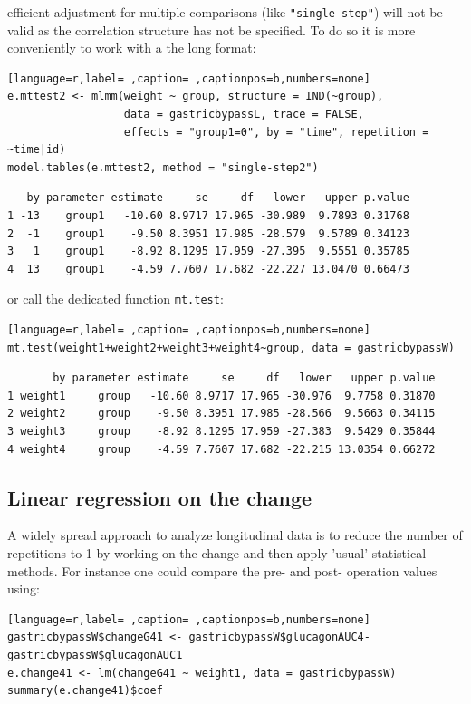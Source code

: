 \documentclass[12pt]{article}
\newcommand\Warning[1][3ex]{%
\renewcommand\stacktype{L}%
\scaleto{\stackon[1.3pt]{\color{red}$\triangle$}{\tiny\bfseries !}}{#1}%
\xspace
}
\begin{document}
\Warning efficient adjustment for multiple comparisons (like
\texttt{"single-step"}) will not be valid as the correlation structure has
not be specified. To do so it is more conveniently to work with a the
long format:
\begin{lstlisting}[language=r,label= ,caption= ,captionpos=b,numbers=none]
e.mttest2 <- mlmm(weight ~ group, structure = IND(~group),
                  data = gastricbypassL, trace = FALSE,
                  effects = "group1=0", by = "time", repetition = ~time|id)
model.tables(e.mttest2, method = "single-step2")
\end{lstlisting}

\begin{verbatim}
   by parameter estimate     se     df   lower   upper p.value
1 -13    group1   -10.60 8.9717 17.965 -30.989  9.7893 0.31768
2  -1    group1    -9.50 8.3951 17.985 -28.579  9.5789 0.34123
3   1    group1    -8.92 8.1295 17.959 -27.395  9.5551 0.35785
4  13    group1    -4.59 7.7607 17.682 -22.227 13.0470 0.66473
\end{verbatim}


or call the dedicated function \texttt{mt.test}:
\begin{lstlisting}[language=r,label= ,caption= ,captionpos=b,numbers=none]
mt.test(weight1+weight2+weight3+weight4~group, data = gastricbypassW)
\end{lstlisting}

\begin{verbatim}
       by parameter estimate     se     df   lower   upper p.value
1 weight1     group   -10.60 8.9717 17.965 -30.976  9.7758 0.31870
2 weight2     group    -9.50 8.3951 17.985 -28.566  9.5663 0.34115
3 weight3     group    -8.92 8.1295 17.959 -27.383  9.5429 0.35844
4 weight4     group    -4.59 7.7607 17.682 -22.215 13.0354 0.66272
\end{verbatim}


\clearpage

\subsection{Linear regression on the change}
\label{sec:orgfda8dce}

A widely spread approach to analyze longitudinal data is to reduce the
number of repetitions to 1 by working on the change and then apply
'usual' statistical methods. For instance one could compare the pre-
and post- operation values using:

\begin{lstlisting}[language=r,label= ,caption= ,captionpos=b,numbers=none]
gastricbypassW$changeG41 <- gastricbypassW$glucagonAUC4-gastricbypassW$glucagonAUC1
e.change41 <- lm(changeG41 ~ weight1, data = gastricbypassW)
summary(e.change41)$coef
\end{lstlisting}
\end{document}
